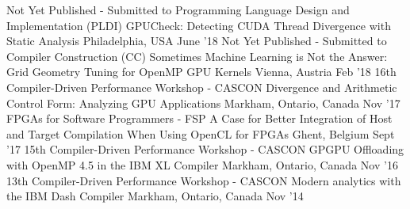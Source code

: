 \begin{cventries}
\publication
  {Not Yet Published - Submitted to Programming Language Design and Implementation (PLDI)}
  {GPUCheck: Detecting CUDA Thread Divergence with Static Analysis}
  {Philadelphia, USA}
  {June '18}
\publication
  {Not Yet Published - Submitted to Compiler Construction (CC)}
  {Sometimes Machine Learning is Not the Answer: Grid Geometry Tuning for OpenMP GPU Kernels}
  {Vienna, Austria}
  {Feb '18}
\presentation
  {16th Compiler-Driven Performance Workshop - CASCON}
  {Divergence and Arithmetic Control Form: Analyzing GPU Applications}
  {Markham, Ontario, Canada}
  {Nov '17}
\publication
  {FPGAs for Software Programmers - FSP}
  {A Case for Better Integration of Host and Target Compilation When Using OpenCL for FPGAs}
  {Ghent, Belgium}
  {Sept '17}
\presentation
  {15th Compiler-Driven Performance Workshop - CASCON}
  {GPGPU Offloading with OpenMP 4.5 in the IBM XL Compiler}
  {Markham, Ontario, Canada}
  {Nov '16}
\presentation
  {13th Compiler-Driven Performance Workshop - CASCON}
  {Modern analytics with the IBM Dash Compiler}
  {Markham, Ontario, Canada}
  {Nov '14}
\end{cventries}
